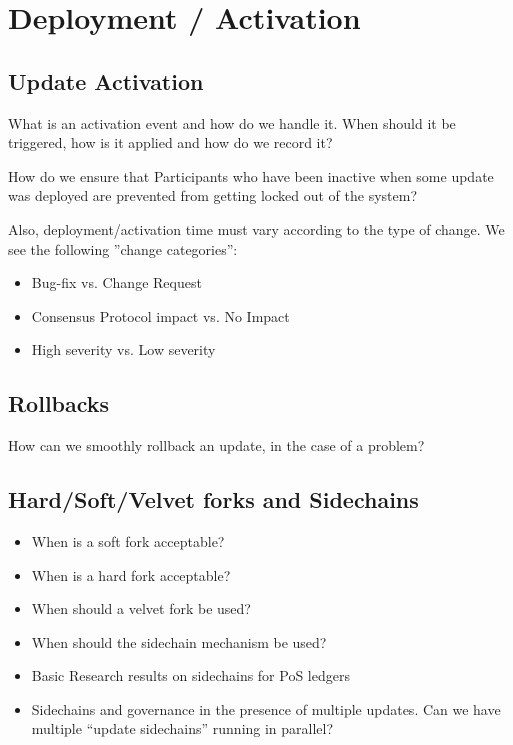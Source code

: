 \section{Deployment / Activation}
\subsection*{Update Activation}
What is an activation event and how do we handle it. When should it be triggered, how is it applied and how do we record it?

How do we ensure that Participants who have been inactive when some update was deployed are  prevented from getting locked out of the system?

Also, deployment/activation time must vary according to the type of change. We see the following ''change categories'':
\begin{itemize}
\item Bug-fix vs. Change Request
\item Consensus Protocol impact vs. No Impact
\item High severity vs. Low severity
\end{itemize}

\subsection*{Rollbacks}
How can we smoothly rollback an update, in the case of a problem?

\subsection*{Hard/Soft/Velvet forks and Sidechains}
\begin{itemize}
\item When is a soft fork acceptable?
\item When is a hard fork acceptable?
\item When should a velvet fork be used?
\item When should the sidechain mechanism be used?
\item Basic Research results on sidechains for PoS ledgers
\item Sidechains and governance in the presence of multiple updates. Can we have multiple “update sidechains” running in parallel?
\end{itemize}
